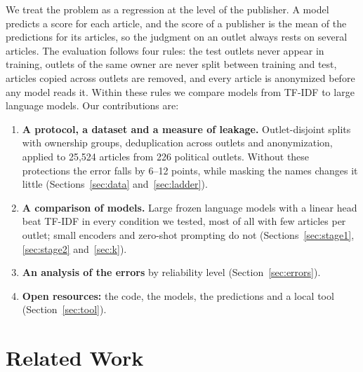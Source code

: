 \documentclass[11pt,a4paper]{article}
\begin{document}
We treat the problem as a regression at the level of the publisher. A model predicts a score for each article, and the
score of a publisher is the mean of the predictions for its articles, so the judgment on an outlet always rests on
several articles. The evaluation follows four rules: the test outlets never appear in training, outlets of the same
owner are never split between training and test, articles copied across outlets are removed, and every article is
anonymized before any model reads it. Within these rules we compare models from TF-IDF to large language models. Our
contributions are:
\begin{enumerate}
  \item \textbf{A protocol, a dataset and a measure of leakage.} Outlet-disjoint splits with ownership groups,
        deduplication across outlets and anonymization, applied to 25,524 articles from 226 political outlets. Without
        these protections the error falls by 6--12 points, while masking the names changes it little
        (Sections~\ref{sec:data} and~\ref{sec:ladder}).
  \item \textbf{A comparison of models.} Large frozen language models with a linear head beat TF-IDF in every condition
        we tested, most of all with few articles per outlet; small encoders and zero-shot prompting do not
        (Sections~\ref{sec:stage1}, \ref{sec:stage2} and~\ref{sec:k}).
  \item \textbf{An analysis of the errors} by reliability level (Section~\ref{sec:errors}).
  \item \textbf{Open resources:} the code, the models, the predictions and a local tool (Section~\ref{sec:tool}).
\end{enumerate}

\section{Related Work}\label{sec:related}
\end{document}
